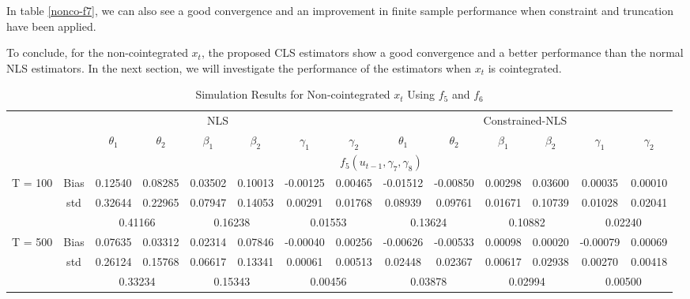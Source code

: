 \documentclass[a4paper,12pt,times,numbered,print,index]{report}
\numberwithin{equation}{section}
\begin{document}
In table \ref{nonco-f7}, we can also see a good convergence and an improvement in finite sample performance when constraint and truncation have been applied. 

To conclude, for the non-cointegrated $x_t$, the proposed CLS estimators show a good convergence and a better performance than the normal NLS estimators. In the next section, we will investigate the performance of the estimators when $x_t$ is cointegrated.

\begin{table}[htbp]
	\centering
	\caption{Simulation Results for Non-cointegrated $x_t$ Using $f_5$ and $f_6$}
	\begin{adjustbox}{max width=\textwidth}
	\begin{tabular}{cccccccccccccc}
		\toprule
		& \multicolumn{7}{c}{NLS}                               & \multicolumn{6}{c}{Constrained-NLS} \\
		&       & $\theta_1$ & $\theta_2$ & $\beta_1$ & $\beta_2$ & $\gamma_1$ & $\gamma_{2}$ & $\theta_1$ & $\theta_2$ & $\beta_1$ & $\beta_2$ & $\gamma_1$ & $\gamma_{2}$ \\
		\midrule
		&       & \multicolumn{12}{c}{$f_5 (u_{t-1}, \gamma_7, \gamma_8)$} \\
		T = 100 & Bias  & \textcolor[rgb]{ .184,  .459,  .71}{0.12540} & 0.08285 & 0.03502 & 0.10013 & -0.00125 & 0.00465 & \textcolor[rgb]{ .184,  .459,  .71}{-0.01512} & -0.00850 & 0.00298 & 0.03600 & 0.00035 & 0.00010 \\
		& std   & 0.32644 & 0.22965 & 0.07947 & 0.14053 & 0.00291 & 0.01768 & 0.08939 & 0.09761 & 0.01671 & 0.10739 & 0.01028 & 0.02041 \\
		&       & \multicolumn{2}{c}{0.41166} & \multicolumn{2}{c}{0.16238} & \multicolumn{2}{c}{0.01553} & \multicolumn{2}{c}{0.13624} & \multicolumn{2}{c}{0.10882} & \multicolumn{2}{c}{0.02240} \\
		\multirow{3}[0]{*}{T = 500} & Bias  & \textcolor[rgb]{ .184,  .459,  .71}{0.07635} & 0.03312 & 0.02314 & 0.07846 & -0.00040 & 0.00256 & \textcolor[rgb]{ .184,  .459,  .71}{-0.00626} & -0.00533 & 0.00098 & 0.00020 & -0.00079 & 0.00069 \\
		& std   & 0.26124 & 0.15768 & 0.06617 & 0.13341 & 0.00061 & 0.00513 & 0.02448 & 0.02367 & 0.00617 & 0.02938 & 0.00270 & 0.00418 \\
		&       & \multicolumn{2}{c}{0.33234} & \multicolumn{2}{c}{0.15343} & \multicolumn{2}{c}{0.00456} & \multicolumn{2}{c}{0.03878} & \multicolumn{2}{c}{0.02994} & \multicolumn{2}{c}{0.00500} \\

\end{tabular}
\end{adjustbox}
\end{table}
\end{document}
